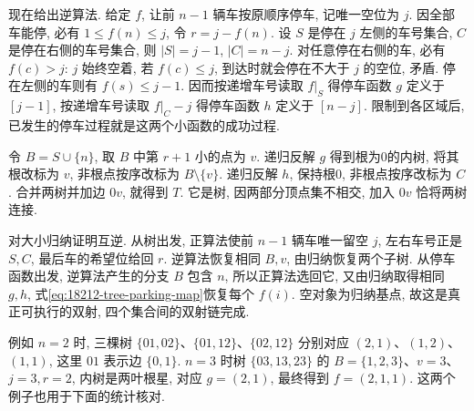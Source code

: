 \begin{solution}
现在给出逆算法. 给定 $f$, 让前 $n-1$ 辆车按原顺序停车, 记唯一空位为 $j$. 因全部车能停, 必有 $1\le f(n)\le j$, 令 $r=j-f(n)$. 设 $S$ 是停在 $j$ 左侧的车号集合, $C$ 是停在右侧的车号集合, 则 $|S|=j-1$, $|C|=n-j$. 对任意停在右侧的车, 必有 $f(c)>j$: $j$ 始终空着, 若 $f(c)\le j$, 到达时就会停在不大于 $j$ 的空位, 矛盾. 停在左侧的车则有 $f(s)\le j-1$. 因而按递增车号读取 $f|_S$ 得停车函数 $g$ 定义于 $[j-1]$, 按递增车号读取 $f|_C-j$ 得停车函数 $h$ 定义于 $[n-j]$. 限制到各区域后, 已发生的停车过程就是这两个小函数的成功过程.

令 $B=S\cup\{n\}$, 取 $B$ 中第 $r+1$ 小的点为 $v$. 递归反解 $g$ 得到根为0的内树, 将其根改标为 $v$, 非根点按序改标为 $B\setminus\{v\}$. 递归反解 $h$, 保持根0, 非根点按序改标为 $C$. 合并两树并加边 $0v$, 就得到 $T$. 它是树, 因两部分顶点集不相交, 加入 $0v$ 恰将两树连接.

对大小归纳证明互逆. 从树出发, 正算法使前 $n-1$ 辆车唯一留空 $j$, 左右车号正是 $S,C$, 最后车的希望位给回 $r$. 逆算法恢复相同 $B,v$, 由归纳恢复两个子树. 从停车函数出发, 逆算法产生的分支 $B$ 包含 $n$, 所以正算法选回它, 又由归纳取得相同 $g,h$, 式\eqref{eq:18212-tree-parking-map}恢复每个 $f(i)$. 空对象为归纳基点, 故这是真正可执行的双射, 四个集合间的双射链完成.

例如 $n=2$ 时, 三棵树 $\{01,02\}$、$\{01,12\}$、$\{02,12\}$ 分别对应 $(2,1)$、$(1,2)$、$(1,1)$, 这里 $01$ 表示边 $\{0,1\}$. $n=3$ 时树 $\{03,13,23\}$ 的 $B=\{1,2,3\}$、$v=3$、$j=3,r=2$, 内树是两叶根星, 对应 $g=(2,1)$, 最终得到 $f=(2,1,1)$. 这两个例子也用于下面的统计核对.
\end{solution}

